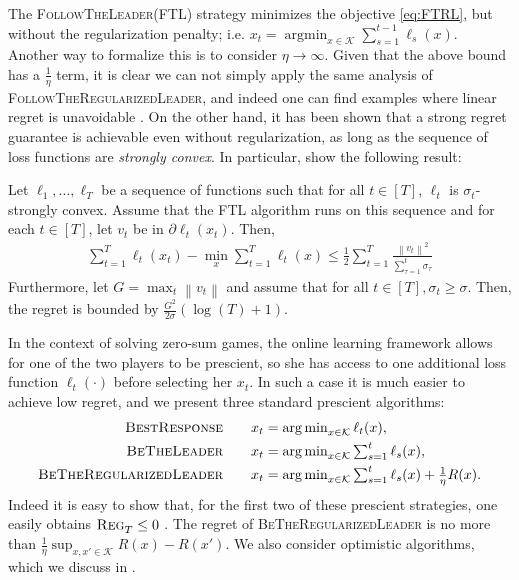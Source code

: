 \documentclass[pmlr]{jmlr} %
\def\K{\mathcal{K}}
\def\argmin{\mathop{\arg\min}}
\def\BTL{\textsc{BeTheLeader}\xspace}
\def\FTL{\textsc{FollowTheLeader}\xspace}
\def\FTRL{\textsc{FollowTheRegularizedLeader}\xspace}
\def\BTRL{\textsc{BeTheRegularizedLeader}\xspace}
\def\BR{\textsc{BestResponse}\xspace}
\newcommand{\norm}[1]{\left\lVert#1\right\rVert}
\newcommand{\uregret}[1]{\textsc{Reg}^{#1}_T}
\begin{document}
The \FTL (FTL) strategy minimizes the objective \eqref{eq:FTRL}, but without the regularization penalty; i.e. $x_{t} = \argmin_{x \in \K} \sum_{s=1}^{t-1} \ell_{s}(x)$. Another way to formalize this is to consider $\eta \to \infty$. Given that the above bound has a $\frac 1 \eta$ term, it is clear we can not simply apply the same analysis of \FTRL, and indeed one can find examples where linear regret is unavoidable \cite{cesa2006prediction,shalev2012online}. On the other hand, it has been shown that a strong regret guarantee is achievable even without regularization, as long as the sequence of loss functions are \emph{strongly convex}. In particular, \cite{KS09} show the following result:
\begin{lemma}\label{lemma:ogd_{s}trCvx}
Let $\ell_{1}, . . . ,\ell_{T}$ be a sequence of functions such that for all $t \in [T]$, $\ell_{t}$ is $\sigma_{t}$-strongly convex. Assume that the FTL algorithm runs on this sequence and for each $t \in [T]$, let $v_{t}$ be in $\partial \ell_{t}(x_{t})$. Then,
\begin{align}
\textstyle \sum_{t=1}^{T} \ell_{t}(x_{t}) - \min_{x} \sum_{t=1}^{T} \ell_{t}(x) 
\le \frac{1}{2}\sum_{t=1}^{T} \frac{\norm{v_{t}}^{2}}{\sum_{\tau=1}^{t}\sigma_{\tau}}
\end{align}
Furthermore, let $G = \max_{t} \norm{v_{t}}$ and assume that for all $t \in [T], \sigma_{t} \ge \sigma$. Then, the regret is bounded by $\frac{G^{2}}{2\sigma}(\log(T) + 1)$.
\end{lemma}
In the context of solving zero-sum games, the online learning framework allows for one of the two players to be prescient, so she has access to one additional loss function $\ell_{t}(\cdot)$ before selecting her $x_{t}$. In such a case it is much easier to achieve low regret, and we present three standard prescient algorithms:
\begin{align}
  \BR\quad\quad & \textstyle x_{t} = \argmin_{x \in \K} \ell_{t}(x),\\
  \BTL\quad\quad & \textstyle x_{t} = \argmin_{x \in \K} \sum_{s=1}^{t} \ell_{s}(x), \\
  \BTRL\quad\quad & \textstyle x_{t} = \argmin_{x \in \K} \sum_{s=1}^{t} \ell_{s}(x) + \frac 1 \eta R(x) .
\end{align}
Indeed it is easy to show that, for the first two of these prescient strategies, one easily obtains $\uregret{} \leq 0$ \citep{kalai2005efficient}. The regret of \BTRL is no more than $\frac 1 \eta \sup_{x,x' \in \K} R(x) - R(x')$. We also consider optimistic algorithms, which we discuss in .
\end{document}
